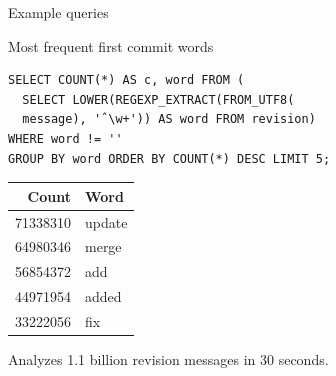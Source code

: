 \documentclass[aspectratio=169,xcolor=table]{beamer}
\begin{document}
    \begin{frame}[fragile]{Example queries}
        \begin{block}{Most frequent first commit words}
            \begin{verbatim}
SELECT COUNT(*) AS c, word FROM (
  SELECT LOWER(REGEXP_EXTRACT(FROM_UTF8(
  message), 'ˆ\w+')) AS word FROM revision)
WHERE word != ''
GROUP BY word ORDER BY COUNT(*) DESC LIMIT 5;
            \end{verbatim}

            \begin{center}
                \begin{tabular}{rl}
                    Count & Word\\
                    \hline
                    \num{71338310} & update\\
                    \num{64980346} & merge\\
                    \num{56854372} & add\\
                    \num{44971954} & added\\
                    \num{33222056} & fix\\
                \end{tabular}
            \end{center}
        \end{block}

        \begin{block}{}
            Analyzes 1.1 billion revision messages in 30 seconds.
        \end{block}
    \end{frame}
\end{document}
